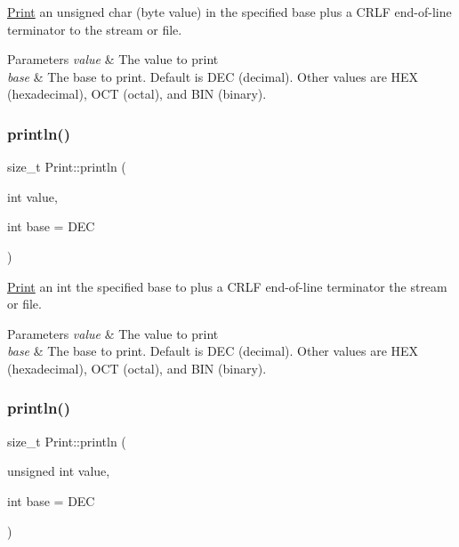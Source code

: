\mbox{\hyperlink{class_print}{Print}} an unsigned char (byte value) in the specified base plus a C\+R\+LF end-\/of-\/line terminator to the stream or file. 


\begin{DoxyParams}{Parameters}
{\em value} & The value to print \\
\hline
{\em base} & The base to print. Default is D\+EC (decimal). Other values are H\+EX (hexadecimal), O\+CT (octal), and B\+IN (binary). \\
\hline
\end{DoxyParams}
\mbox{\label{class_print_a82aa91bbd859f28a0a3b4869e5bfcadd}} 
\subsubsection{\texorpdfstring{println()}{println()}\hspace{0.1cm}{\footnotesize\ttfamily [2/6]}}
{\footnotesize\ttfamily size\+\_\+t Print\+::println (\begin{DoxyParamCaption}\item[{int}]{value,  }\item[{int}]{base = {\ttfamily DEC} }\end{DoxyParamCaption})}



\mbox{\hyperlink{class_print}{Print}} an int the specified base to plus a C\+R\+LF end-\/of-\/line terminator the stream or file. 


\begin{DoxyParams}{Parameters}
{\em value} & The value to print \\
\hline
{\em base} & The base to print. Default is D\+EC (decimal). Other values are H\+EX (hexadecimal), O\+CT (octal), and B\+IN (binary). \\
\hline
\end{DoxyParams}
\mbox{\label{class_print_a2608232c1f10f654111ff447de16d60b}} 
\subsubsection{\texorpdfstring{println()}{println()}\hspace{0.1cm}{\footnotesize\ttfamily [3/6]}}
{\footnotesize\ttfamily size\+\_\+t Print\+::println (\begin{DoxyParamCaption}\item[{unsigned int}]{value,  }\item[{int}]{base = {\ttfamily DEC} }\end{DoxyParamCaption})}



